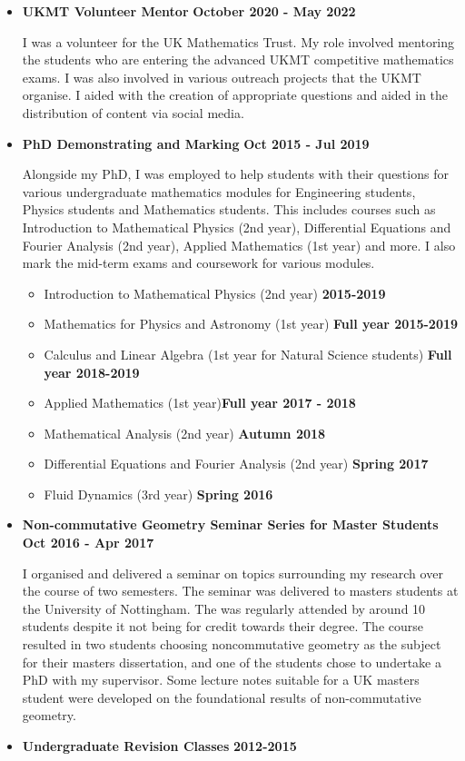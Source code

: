 \documentclass[10pt]{article}
\providecommand{\tightlist}{%
  \setlength{\itemsep}{0pt}\setlength{\parskip}{0pt}}
\begin{document}
\begin{itemize}
\item
  \textbf{UKMT Volunteer
  Mentor}\hfill \textbf{ October 2020 - May 2022 }

  I was a volunteer for the UK Mathematics Trust. My role involved
  mentoring the students who are entering the advanced UKMT competitive
  mathematics exams. I was also involved in various outreach projects
  that the UKMT organise. I aided with the creation of appropriate
  questions and aided in the distribution of content via social media.
\item
  \textbf{ PhD Demonstrating and Marking}
  \hfill \textbf{ Oct 2015 - Jul 2019}

  Alongside my PhD, I was employed to help students with their questions
  for various undergraduate mathematics modules for Engineering
  students, Physics students and Mathematics students. This includes
  courses such as Introduction to Mathematical Physics (2nd year),
  Differential Equations and Fourier Analysis (2nd year), Applied
  Mathematics (1st year) and more. I also mark the mid-term exams and
  coursework for various modules.

  \begin{itemize}
  \tightlist
  \item
    Introduction to Mathematical Physics (2nd year)
    \hfill \textbf{ 2015-2019}
  \item
    Mathematics for Physics and Astronomy (1st year)
    \hfill \textbf{ Full year 2015-2019}
  \item
    Calculus and Linear Algebra (1st year for Natural Science students)
    \hfill \textbf{Full year 2018-2019}
  \item
    Applied Mathematics (1st year)\hfill \textbf{Full year 2017 - 2018}
  \item
    Mathematical Analysis (2nd year) \hfill \textbf{ Autumn 2018}
  \item
    Differential Equations and Fourier Analysis (2nd year)
    \hfill \textbf{Spring 2017}
  \item
    Fluid Dynamics (3rd year) \hfill \textbf{Spring 2016 }
  \end{itemize}
\item
  \textbf{ Non-commutative Geometry Seminar Series for Master Students}
  \hfill \textbf{ Oct 2016 - Apr 2017}

  I organised and delivered a seminar on topics surrounding my research
  over the course of two semesters. The seminar was delivered to masters
  students at the University of Nottingham. The was regularly attended
  by around 10 students despite it not being for credit towards their
  degree. The course resulted in two students choosing noncommutative
  geometry as the subject for their masters dissertation, and one of the
  students chose to undertake a PhD with my supervisor. Some lecture
  notes suitable for a UK masters student were developed on the
  foundational results of non-commutative geometry.
\item
  \textbf{Undergraduate Revision Classes} \hfill \textbf{ 2012-2015}


\end{itemize}
\end{document}
